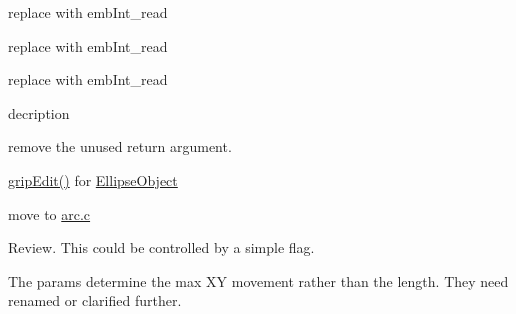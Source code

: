 \begin{DoxyRefList}
%
replace with emb\+Int\+\_\+read  
\item[Member \mbox{\hyperlink{formats_8c_a760e806c16c1612a6b5ca5a26bc736d1}{binary\+Write\+UShort}} (FILE $\ast$f, unsigned short data)]\label{todo__todo000220}%
%
replace with emb\+Int\+\_\+read  
\item[Member \mbox{\hyperlink{formats_8c_ac93ea02c7dfc79fb81e7e7cc5acea14a}{binary\+Write\+UShort\+BE}} (FILE $\ast$f, unsigned short data)]\label{todo__todo000221}%
%
replace with emb\+Int\+\_\+read  
\item[Member \mbox{\hyperlink{main_8c_a5d7bf5f964ae87921bab916b871ea2dd}{copy\+\_\+trim}} (char const $\ast$s)]\label{todo__todo000228}%
%
decription  
\item[Member \mbox{\hyperlink{encoding_8c_a9a4ef6979894437de607ac59967d6691}{decode\+\_\+t01\+\_\+record}} (unsigned char b\mbox{[}3\mbox{]}, int $\ast$x, int $\ast$y, int $\ast$flags)]\label{todo__todo000210}%
%
remove the unused return argument.  
\item[Member \mbox{\hyperlink{class_ellipse_object_af377b9b2e3594940757c25610899c02b}{Ellipse\+Object\+::grip\+Edit}} (const QPointF \&before, const QPointF \&after)]\label{todo__todo000011}%
%
\mbox{\hyperlink{class_ellipse_object_af377b9b2e3594940757c25610899c02b}{grip\+Edit()}} for \mbox{\hyperlink{class_ellipse_object}{Ellipse\+Object}}  
\item[Member \mbox{\hyperlink{main_8c_a16e1e46c5c33874fc9a63476e70c0d66}{emb\+Arc\+\_\+print}} (Emb\+Arc arc)]\label{todo__todo000227}%
%
move to \mbox{\hyperlink{arc_8c}{arc.\+c}}  
\item[Member \mbox{\hyperlink{geometry_8c_ae6461f57f08ce5992c70fa9897988644}{emb\+Geometry\+\_\+vulcanize}} (Emb\+Geometry $\ast$obj)]\label{todo__todo000226}%
%
Review. This could be controlled by a simple flag.  
\item[Member \mbox{\hyperlink{pattern_8c_a6d1fde93564a15d1ec24399fc613d1ac}{emb\+Pattern\+\_\+correct\+For\+Max\+Stitch\+Length}} (Emb\+Pattern $\ast$p, Emb\+Real max\+Stitch\+Length, Emb\+Real max\+Jump\+Length)]\label{todo__todo000229}%
%
The params determine the max XY movement rather than the length. They need renamed or clarified further.  
\item[Member \mbox{\hyperlink{fill_8c_a63bc84e4406e59c092a2e076afedf930}{emb\+Pattern\+\_\+stitch\+Ellipse}} (Emb\+Pattern $\ast$p, Emb\+Ellipse ellipse, int thread\+\_\+index, int style)]\label{todo__todo000212}%

\end{DoxyRefList}
